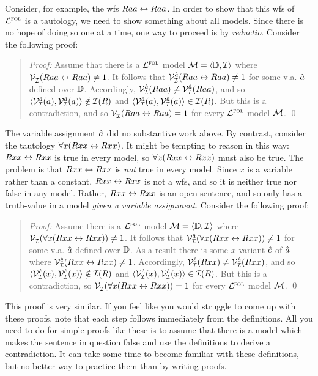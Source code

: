 Consider, for example, the wfs $Raa\leftrightarrow Raa$.
In order to show that this wfs of $\mathcal{L}^{\textsc{fol}}$ is a tautology, we need to show something about all models.
Since there is no hope of doing so one at a time, one way to proceed is by \textit{reductio}.
Consider the following proof:

\begin{quote}
\label{allmodels1}
  \textit{Proof:}
  Assume that there is a $\mathcal{L}^{\textsc{fol}}$ model $\mathcal{M}=\langle\mathbb{D},\mathcal{I}\rangle$ where $\mathcal{V}_{\mathcal{I}}^{}(Raa\leftrightarrow Raa)\neq 1$.
  It follows that $\mathcal{V}_{\mathcal{I}}^{\hat{a}}(Raa\leftrightarrow Raa)\neq 1$ for some v.a. $\hat{a}$ defined over $\mathbb{D}$.
  Accordingly, $\mathcal{V}_{\mathcal{I}}^{\hat{a}}(Raa)\neq\mathcal{V}_{\mathcal{I}}^{\hat{a}}(Raa)$, and so $\langle\mathcal{V}_{\mathcal{I}}^{\hat{a}}(a),\mathcal{V}_{\mathcal{I}}^{\hat{a}}(a)\rangle\notin\mathcal{I}(R)$ and $\langle\mathcal{V}_{\mathcal{I}}^{\hat{a}}(a),\mathcal{V}_{\mathcal{I}}^{\hat{a}}(a)\rangle\in\mathcal{I}(R)$.
  But this is a contradiction, and so $\mathcal{V}_{\mathcal{I}}^{}(Raa\leftrightarrow Raa)=1$ for every $\mathcal{L}^{\textsc{fol}}$ model $\mathcal{M}$.
  \qed
\end{quote}

The variable assignment $\hat{a}$ did no substantive work above. 
By contrast, consider the tautology $\forall x(Rxx\leftrightarrow Rxx)$.
It might be tempting to reason in this way: $Rxx\leftrightarrow Rxx$ is true in every model, so $\forall x(Rxx\leftrightarrow Rxx)$ must also be true.
The problem is that $Rxx\leftrightarrow Rxx$ is \emph{not} true in every model.
Since $x$ is a variable rather than a constant, $Rxx\leftrightarrow Rxx$ is not a wfs, and so it is neither true nor false in any model.
Rather, $Rxx\leftrightarrow Rxx$ is an open sentence, and so only has a truth-value in a model \textit{given a variable assignment}. 
Consider the following proof:

\begin{quote}
\label{allmodels2}
  \textit{Proof:}
  Assume there is a $\mathcal{L}^{\textsc{fol}}$ model $\mathcal{M}=\langle\mathbb{D},\mathcal{I}\rangle$ where $\mathcal{V}_{\mathcal{I}}^{}(\forall x(Rxx\leftrightarrow Rxx))\neq 1$.
  It follows that $\mathcal{V}_{\mathcal{I}}^{\hat{a}}(\forall x(Rxx\leftrightarrow Rxx))\neq 1$ for some v.a. $\hat{a}$ defined over $\mathbb{D}$.
  As a result there is some $x$-variant $\hat{c}$ of $\hat{a}$ where $\mathcal{V}_{\mathcal{I}}^{\hat{c}}(Rxx\leftrightarrow Rxx)\neq 1$.
  Accordingly, $\mathcal{V}_{\mathcal{I}}^{\hat{c}}(Rxx)\neq\mathcal{V}_{\mathcal{I}}^{\hat{c}}(Rxx)$, and so $\langle\mathcal{V}_{\mathcal{I}}^{\hat{c}}(x),\mathcal{V}_{\mathcal{I}}^{\hat{c}}(x)\rangle\notin\mathcal{I}(R)$ and $\langle\mathcal{V}_{\mathcal{I}}^{\hat{c}}(x),\mathcal{V}_{\mathcal{I}}^{\hat{c}}(x)\rangle\in\mathcal{I}(R)$.
  But this is a contradiction, so $\mathcal{V}_{\mathcal{I}}^{}(\forall x(Rxx\leftrightarrow Rxx))=1$ for every $\mathcal{L}^{\textsc{fol}}$ model $\mathcal{M}$.
  \qed
\end{quote}

This proof is very similar.
If you feel like you would struggle to come up with these proofs, note that each step follows immediately from the definitions.
All you need to do for simple proofs like these is to assume that there is a model which makes the sentence in question false and use the definitions to derive a contradiction.
It can take some time to become familiar with these definitions, but no better way to practice them than by writing proofs.

